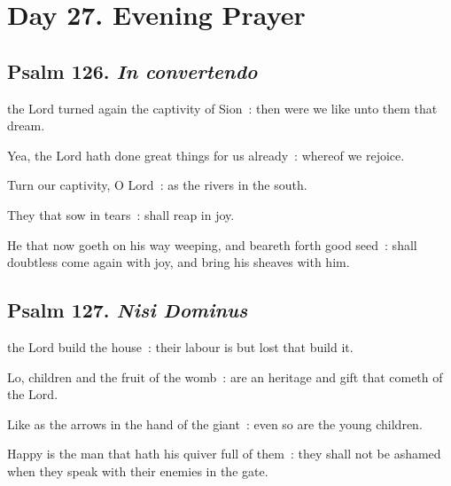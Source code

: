 \section*{Day 27. Evening Prayer}

\subsection{Psalm 126. \textit{In convertendo}}

 the Lord turned again the captivity of Sion~: then were we like unto them that dream.\par
{}
Yea, the Lord hath done great things for us already~: whereof we rejoice.\par
{}Turn our captivity, O Lord~: as the rivers in the south.\par
{}They that sow in tears~: shall reap in joy.\par
{}He that now goeth on his way weeping, and beareth forth good seed~: shall doubtless come again with joy, and bring his sheaves with him.\par

\subsection{Psalm 127. \textit{Nisi Dominus}}

 the Lord build the house~: their labour is but lost that build it.\par
{}
Lo, children and the fruit of the womb~: are an heritage and gift that cometh of the Lord.\par
{}Like as the arrows in the hand of the giant~: even so are the young children.\par
{}Happy is the man that hath his quiver full of them~: they shall not be ashamed when they speak with their enemies in the gate.\par

